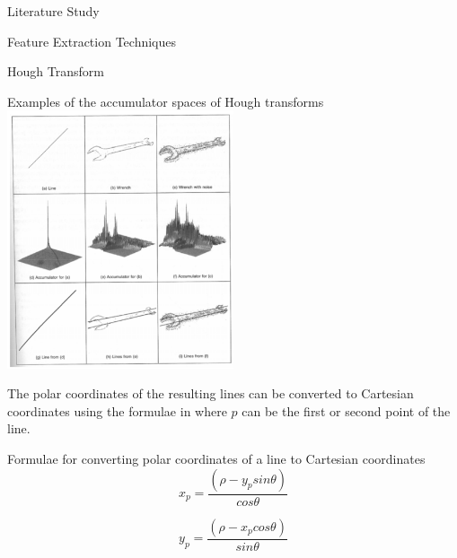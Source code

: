 \documentclass{matthijs}
\begin{document}
\begin{hoofdstuk}{Literature Study}
\begin{paragraaf}{Feature Extraction Techniques}
\begin{subparagraaf}{Hough Transform}
				\begin{figuur}{Examples of the accumulator spaces of Hough transforms}
					\includegraphics[width=0.5\textwidth]{solberg2009hough-img1.png}
					\cite{solberg2009hough}
				\end{figuur}

				The polar coordinates of the resulting lines can be converted to Cartesian coordinates using the formulae in  where $p$ can be the first or second point of the line.
				
				\begin{figuur}{Formulae for converting polar coordinates of a line to Cartesian coordinates}
					\begin{equation*}
						x_p = \frac{(\rho - y_p sin \theta)}{cos \theta}
					\end{equation*}

					\vspace{-2ex}

					\begin{equation*}
						y_p = \frac{(\rho - x_p cos \theta)}{sin \theta}
					\end{equation*}

					\vspace{1ex}

					\cite{dawkins2018polar}
				\end{figuur}
			

\end{subparagraaf}
\end{paragraaf}
\end{hoofdstuk}
\end{document}
